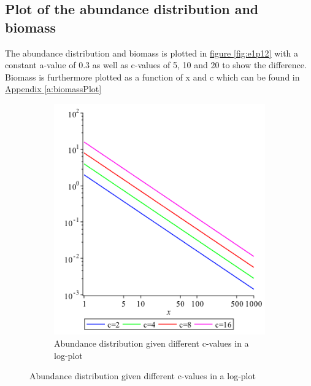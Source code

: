 \documentclass{article}
\numberwithin{equation}{section} %
\begin{document}
\subsection{Plot of the abundance distribution and biomass}\label{sec:Ex1A}
The abundance distribution and biomass is plotted in \hyperref[fig:e1p12]{figure \ref{fig:e1p12}} with a constant a-value of 0.3 as well as c-values of 5, 10 and 20 to show the difference. Biomass is furthermore plotted as a function of x and c which can be found in \hyperref[a:biomassPlot]{Appendix \ref{a:biomassPlot}}\label{jmp:a:biomassPlot}
\begin{figure}[t!]
 
\begin{subfigure}[t]{0.5\textwidth}
\includegraphics[width=0.9\linewidth]{exercises/e1p1} 
\caption{Abundance distribution given different c-values in a log-plot}


\end{subfigure}
\end{figure}
\end{document}
